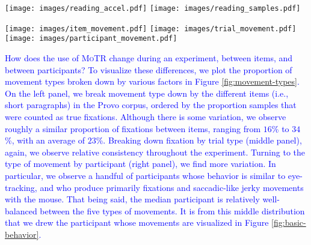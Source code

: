 \documentclass[12pt]{article}
\newcommand{\motr}{\textsc{MoTR}\xspace}
\newcommand{\change}[1]{\textcolor{blue}{#1}}
\begin{document}
{\begin{figure*}[t]
    \centering
    \texttt{[image: images/reading\_accel.pdf]}
    \texttt{[image: images/reading\_samples.pdf]}
    \caption{\change{\textbf{\motr Reading Strategies:} The left panel shows the velocity (red) and acceleration (blue/green) for one participant reading a portion of the Provo corpus. The right panel shows the samples taken during this period, which are categorized into true fixations, decelerations, accelerations, movements of constant velocity, and offscreen time. Light blue background bands indicate associations with words, which are used to compute reading measures.}}
    \label{fig:basic-behavior}
\end{figure*}
\begin{figure*}[th!]
    \centering
    \texttt{[image: images/item\_movement.pdf]}
    \texttt{[image: images/trial\_movement.pdf]}
    \texttt{[image: images/participant\_movement.pdf]}
    \caption{\change{\textbf{Movement type by trial, item, and participant:} Bars show the proportion of samples from each movement type, categorized as true fixations (red), decelerations (orange), other types of movement (green), and offscreen time (gray).}}
    \label{fig:movement-types}
\end{figure*}

\change{How does the use of \motr change during an experiment, between items, and between participants? To visualize these differences, we plot the proportion of movement types broken down by various factors in Figure \ref{fig:movement-types}. On the left panel, we break movement type down by the different items (i.e., short paragraphs) in the Provo corpus, ordered by the proportion samples that were counted as true fixations. Although there is some variation, we observe roughly a similar proportion of fixations between items, ranging from $16$\% to $34$\%, with an average of $23$\%. Breaking down fixation by trial type (middle panel), again, we observe relative consistency throughout the experiment. %
Turning to the type of movement by participant (right panel), we find more variation. In particular, we observe a handful of participants whose behavior is similar to eye-tracking, and who produce primarily fixations and saccadic-like jerky movements with the mouse. That being said, the median participant is relatively well-balanced between the five types of movements. It is from this middle distribution that we drew the participant whose movements are visualized in Figure \ref{fig:basic-behavior}.}


}
\end{document}
